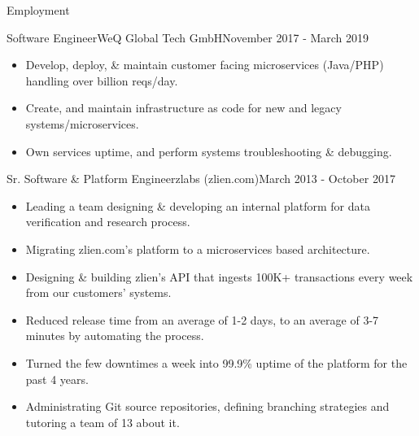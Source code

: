 \documentclass[]{mosabcv}
\begin{document}
\makeheader

\begin{cvsection}{Employment}
    
    \begin{cvsubsection}{Software Engineer}{WeQ Global Tech GmbH}{November 2017 - March 2019}
        \begin{itemize}
            \item Develop, deploy, \& maintain customer facing microservices (Java/PHP) handling over billion reqs/day.
            \item Create, and maintain infrastructure as code for new and legacy systems/microservices.
            \item Own services uptime, and perform systems troubleshooting \& debugging.
        \end{itemize}
    \end{cvsubsection}
            
    \begin{cvsubsection}{Sr. Software \& Platform Engineer}{zlabs (zlien.com)}{March 2013 - October 2017}
        \begin{itemize}
            \item Leading a team designing \& developing an internal platform for data verification and research process.
            \item Migrating zlien.com's platform to a microservices based architecture.
            \item Designing \& building zlien's API that ingests 100K+ transactions every week from our customers' systems.
            \item Reduced release time from an average of 1-2 days, to an average of 3-7 minutes by automating the process.
            \item Turned the few downtimes a week into 99.9\% uptime of the platform for the past 4 years.
            \item Administrating Git source repositories, defining branching strategies and tutoring a team of 13 about it.
        \end{itemize}
    \end{cvsubsection}
    

\end{cvsection}
\end{document}
